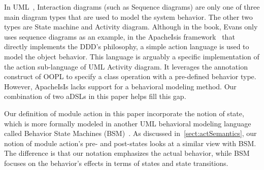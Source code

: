 %
%  

In UML~\cite{omg_unified_2015}, Interaction diagrams (such as Sequence diagrams) are only one of three main diagram types that are used to model the system behavior. The other two types are State machine and Activity diagram. Although in the book, Evans only uses sequence diagrams as an example, in the ApacheIsis framework~\cite{dan_haywood_apache_2013} that directly implements the DDD's philosophy, a simple action language is used to model the object behavior. This language is arguably a specific implementation of the action sub-language of UML Activity diagram. It leverages the annotation construct of OOPL to specify a class operation with a pre-defined behavior type. 
However, ApacheIsIs lacks support for a behavioral modeling method. Our combination of two aDSLs in this paper helps fill this gap.

Our definition of module action in this paper incorporate the notion of state, which is more formally modeled in another UML behavioral modeling language called Behavior State Machines (BSM)~\cite{omg_unified_2015}. 
As discussed in~\ref{sect:actSemantics}, our notion of module action's pre- and post-states looks at a similar view with BSM. The difference is that our notation emphasizes the actual behavior, while BSM focuses on the behavior's effects in terms of states and state transitions.

